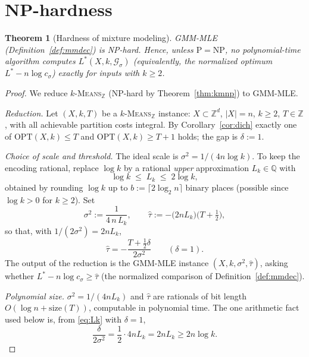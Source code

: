\documentclass{amsart}
\theoremstyle{plain}
\newtheorem{theorem}{Theorem}
\theoremstyle{definition}
\newcommand{\Z}{\mathbb{Z}}
\newcommand{\Q}{\mathbb{Q}}
\begin{document}
\section{NP-hardness}

\begin{theorem}[Hardness of mixture modeling]\label{thm:main}
\textsc{GMM-MLE} (Definition~\ref{def:mmdec}) is NP-hard. Hence, unless
$\mathrm{P}=\mathrm{NP}$, no polynomial-time algorithm computes
$L^{\ast}(X,k,\mathcal G_{\sigma})$ (equivalently, the normalized optimum
$L^{\ast}-n\log c_{\sigma}$) exactly for inputs with $k\ge2$.
\end{theorem}

\begin{proof}
We reduce \textsc{$k$-Means$_{\Z}$} (NP-hard by Theorem~\ref{thm:kmnp}) to
\textsc{GMM-MLE}.

\emph{Reduction.} Let $(X,k,T)$ be a \textsc{$k$-Means$_{\Z}$} instance:
$X\subset\Z^{d}$, $|X|=n$, $k\ge2$, $T\in\Z$, with all achievable partition costs
integral. By Corollary~\ref{cor:dich} exactly one of $\mathrm{OPT}(X,k)\le T$ and
$\mathrm{OPT}(X,k)\ge T+1$ holds; the gap is $\delta:=1$.

\emph{Choice of scale and threshold.} The ideal scale is
$\sigma^{2}=1/(4n\log k)$. To keep the encoding rational, replace $\log k$ by a
rational \emph{upper} approximation $L_{k}\in\Q$ with
\begin{equation}\label{eq:Lk}
\log k\;\le\;L_{k}\;\le\;2\log k,
\end{equation}
obtained by rounding $\log k$ up to $b:=\lceil 2\log_{2}n\rceil$ binary places
(possible since $\log k>0$ for $k\ge2$). Set
\[
\sigma^{2}:=\frac{1}{4\,n\,L_{k}},
\qquad
\widehat\tau:=-\big(2nL_{k}\big)\Big(T+\tfrac12\Big),
\]
so that, with $1/(2\sigma^{2})=2nL_{k}$,
\begin{equation}\label{eq:tauform}
\widehat\tau=-\frac{T+\tfrac12\delta}{2\sigma^{2}}\qquad(\delta=1).
\end{equation}
The output of the reduction is the \textsc{GMM-MLE} instance
$(X,k,\sigma^{2},\widehat\tau)$, asking whether
$L^{\ast}-n\log c_{\sigma}\ge\widehat\tau$ (the normalized comparison of
Definition~\ref{def:mmdec}).

\emph{Polynomial size.} $\sigma^{2}=1/(4nL_{k})$ and $\widehat\tau$ are rationals
of bit length $O(\log n+\mathrm{size}(T))$, computable in polynomial time. The one
arithmetic fact used below is, from \eqref{eq:Lk} with $\delta=1$,
\begin{equation}\label{eq:key}
\frac{\delta}{2\sigma^{2}}=\frac{1}{2}\cdot 4nL_{k}=2nL_{k}\ge 2n\log k .
\end{equation}


\end{proof}
\end{document}
